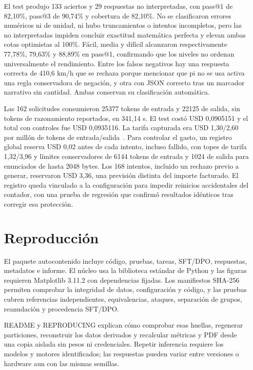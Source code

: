 El test produjo 133 aciertos y 29 respuestas no interpretadas, con pass@1 de
82,10\%, pass@3 de 90,74\% y cobertura de 82,10\%. No se clasificaron errores
numéricos ni de unidad, ni hubo truncamientos o intentos incompletos, pero las
no interpretadas impiden concluir exactitud matemática perfecta y elevan ambas
cotas optimistas al 100\%. Fácil, media y difícil alcanzaron respectivamente
77,78\%, 79,63\% y 88,89\% en pass@1, confirmando que los niveles no ordenan
universalmente el rendimiento. Entre los falsos negativos hay una respuesta
correcta de 410,6 km/h que se rechaza porque mencionar que pi no se usa activa
una regla conservadora de negación, y otra con JSON correcto tras un marcador
narrativo sin cantidad. Ambas conservan su clasificación automática.

Las 162 solicitudes consumieron 25377 tokens de entrada y 22125 de salida,
sin tokens de razonamiento reportados, en 341,14 s. El test costó USD 0,0905151
y el total con controles fue USD 0,0935116. La tarifa capturada era
USD 1,30/2,60 por millón de tokens de entrada/salida~\cite{routing,pricing}.
Para controlar el gasto, un registro global reserva USD 0,02 antes de cada
intento, incluso fallido, con topes de tarifa 1,32/3,96 y límites conservadores
de 6144 tokens de entrada y 1024 de salida para enunciados de hasta 2048 bytes.
Los 168 intentos, incluido un rechazo previo a generar, reservaron USD 3,36,
una previsión distinta del importe facturado. El registro queda vinculado a la
configuración para impedir reinicios accidentales del contador, con una prueba
de regresión que confirmó resultados idénticos tras corregir esa protección.

\section{Reproducción}
El paquete autocontenido incluye código, pruebas, tareas, SFT/DPO, respuestas,
metadatos e informe. El núcleo usa la biblioteca estándar de Python y las
figuras requieren Matplotlib 3.11.2 con dependencias fijadas. Los manifiestos
SHA-256 permiten comprobar la integridad de datos, configuración y código,
y las pruebas cubren referencias independientes, equivalencias, ataques,
separación de grupos, reanudación y procedencia SFT/DPO.

README y REPRODUCING explican cómo comprobar esas huellas, regenerar particiones,
reconstruir los datos derivados y recalcular métricas y PDF desde una copia aislada sin pesos
ni credenciales. Repetir inferencia requiere los modelos y motores identificados;
las respuestas pueden variar entre versiones o hardware aun con las mismas semillas.

